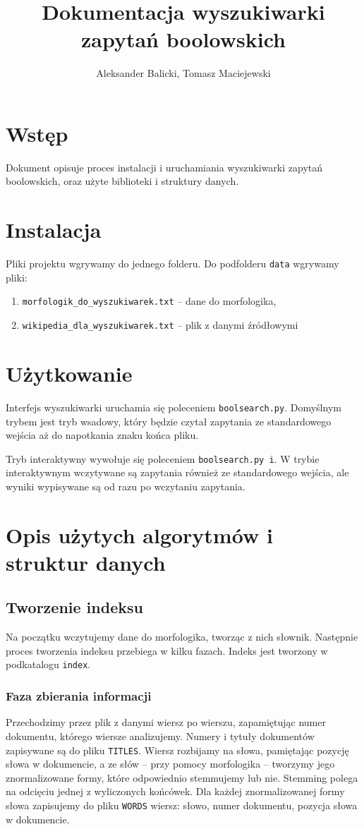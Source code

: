 \documentclass[11pt]{article}
\author{Aleksander Balicki, Tomasz Maciejewski}
\title{Dokumentacja wyszukiwarki zapytań boolowskich}
\begin{document}
\maketitle

\section{Wstęp}
Dokument opisuje proces instalacji i uruchamiania wyszukiwarki zapytań boolowskich, oraz użyte biblioteki i struktury danych.

\section{Instalacja}
Pliki projektu wgrywamy do jednego folderu. Do podfolderu \texttt{data} wgrywamy pliki:
\begin{enumerate}
\item \texttt{morfologik\_do\_wyszukiwarek.txt} -- dane do morfologika,
\item \texttt{wikipedia\_dla\_wyszukiwarek.txt} -- plik z danymi źródłowymi
\end{enumerate}

\section{Użytkowanie}
Interfejs wyszukiwarki uruchamia się poleceniem \texttt{boolsearch.py}. Domyślnym trybem jest tryb wsadowy, który będzie czytał zapytania ze standardowego wejścia aż do napotkania znaku końca pliku.

Tryb interaktywny wywołuje się poleceniem \texttt{boolsearch.py i}. W trybie interaktywnym wczytywane są zapytania również ze standardowego wejścia, ale wyniki wypisywane są od razu po wczytaniu zapytania.

\section{Opis użytych algorytmów i struktur danych}

\subsection{Tworzenie indeksu}
Na początku wczytujemy dane do morfologika, tworząc z nich słownik. Następnie proces tworzenia indeksu przebiega w kilku fazach. Indeks jest tworzony w podkatalogu \texttt{index}.

\subsubsection{Faza zbierania informacji}
Przechodzimy przez plik z danymi wiersz po wierszu, zapamiętując numer dokumentu, którego wiersze analizujemy. Numery i tytuły dokumentów zapisywane są do pliku \texttt{TITLES}. Wiersz rozbijamy na słowa, pamiętając pozycję słowa w dokumencie, a ze słów -- przy pomocy morfologika -- tworzymy jego znormalizowane formy, które odpowiednio stemmujemy lub nie. Stemming polega na odcięciu jednej z wyliczonych końcówek. Dla każdej znormalizowanej formy słowa zapisujemy do pliku \texttt{WORDS} wiersz: słowo, numer dokumentu, pozycja słowa w dokumencie.
\end{document}

